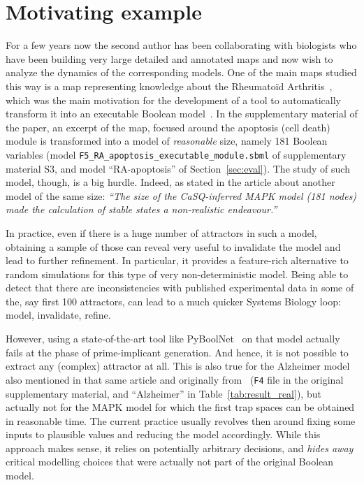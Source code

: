 \documentclass[runningheads]{llncs}
\begin{document}
\section{Motivating example}

For a few years now the second author has been collaborating with biologists who have been building very large detailed and annotated maps and now wish to analyze the dynamics of the corresponding models.
One of the main maps studied this way is a map representing knowledge about the Rheumatoïd Arthritis~\cite{singh2018computational}, which was the main motivation for the development of a tool to automatically transform it into an executable Boolean model~\cite{aghamiri2020automated}.
In the supplementary material of the paper, an excerpt of the map, focused around the apoptosis (cell death) module is transformed into a model of \emph{reasonable} size, namely 181 Boolean variables (model \verb|F5_RA_apoptosis_executable_module.sbml| of supplementary material S3, and model ``RA-apoptosis'' of Section~\ref{sec:eval}).
The study of such model, though, is a big hurdle.
Indeed, as stated in the article about another model of the same size:
\emph{``The size of the CaSQ-inferred MAPK model (181 nodes) made the calculation of stable states a non-realistic endeavour.''}

In practice, even if there is a huge number of attractors in such a model, obtaining a sample of those can reveal very useful to invalidate the model and lead to further refinement.
In particular, it provides a feature-rich alternative to random simulations for this type of very non-deterministic model.
Being able to detect that there are inconsistencies with published experimental data in some of the, say first 100 attractors, can lead to a much quicker Systems Biology loop: model, invalidate, refine.

However, using a state-of-the-art tool like PyBoolNet~\cite{klarner2015computing} on that model actually fails at the phase of prime-implicant generation.
And hence, it is not possible to extract any (complex) attractor at all.
This is also true for the Alzheimer model also mentioned in that same article and originally from~\cite{ogishima2016alzpathway} (\verb|F4| file in the original supplementary material, and ``Alzheimer'' in Table~\ref{tab:result_real}), but actually not for the MAPK model for which the first trap spaces can be obtained in reasonable time.
The current practice usually revolves then around fixing some inputs to plausible values and reducing the model accordingly.
While this approach makes sense, it relies on potentially arbitrary decisions, and \emph{hides away} critical modelling choices that were actually not part of the original Boolean model.
\end{document}
